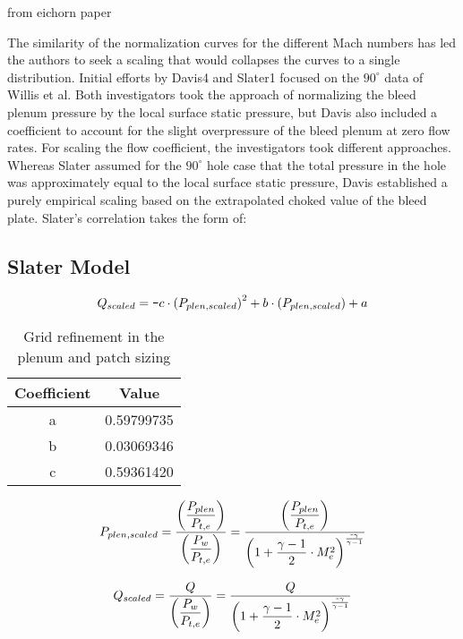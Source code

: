 \documentclass{article}
\begin{document}
from eichorn paper

The similarity of the normalization curves for the different Mach numbers has led the authors to seek a scaling that would collapses the curves to a single distribution. Initial efforts by Davis4 and Slater1 focused on the $90^\circ$ data of Willis et al. Both investigators took the approach of normalizing the bleed plenum pressure by the local surface static pressure, but Davis also included a coefficient to account for the slight overpressure of the bleed plenum at zero flow rates. For scaling the flow coefficient, the investigators took different approaches. Whereas Slater assumed for the $90^\circ$ hole case that the total pressure in the hole was approximately equal to the local surface static pressure, Davis established a purely empirical scaling based on the extrapolated choked value of the bleed plate. Slater’s correlation takes the form of:

\subsection{Slater Model}


$$ Q_{scaled} = \texttt{-} c \cdot \qty(P_{plen, scaled})^2 + b\cdot \qty(P_{plen, scaled}) + a$$


\begin{table}[!htbp] \centering 
\begin{tabular}[c]{*{2}{c}} \hline
\textbf{Coefficient} & \textbf{Value}   \\ \hline
a   & 0.59799735  \\ 
b   & 0.03069346  \\ 
c   & 0.59361420  \\ \hline
\end{tabular} 
\caption{Grid refinement in the plenum and patch sizing} 
\label{tab:slater} \end{table}

$$ P_{plen,scaled} = \dfrac{\qty(\dfrac{P_{plen}}{P_{t,e}})}{\qty(\dfrac{P_w}{P_{t,e}})} = \dfrac{\qty(\dfrac{P_{plen}}{P_{t,e}})}{\qty(1+\dfrac{\gamma-1}{2}\cdot M^2_e)^{\frac{\texttt{-}\gamma}{\gamma-1}}} $$


$$ Q_{scaled} = \dfrac{Q}{\qty(\dfrac{P_w}{P_{t,e}})} = \dfrac{Q}{\qty(1+\dfrac{\gamma-1}{2}\cdot M^2_e)^{\frac{\texttt{-}\gamma}{\gamma-1}}} $$
\end{document}
